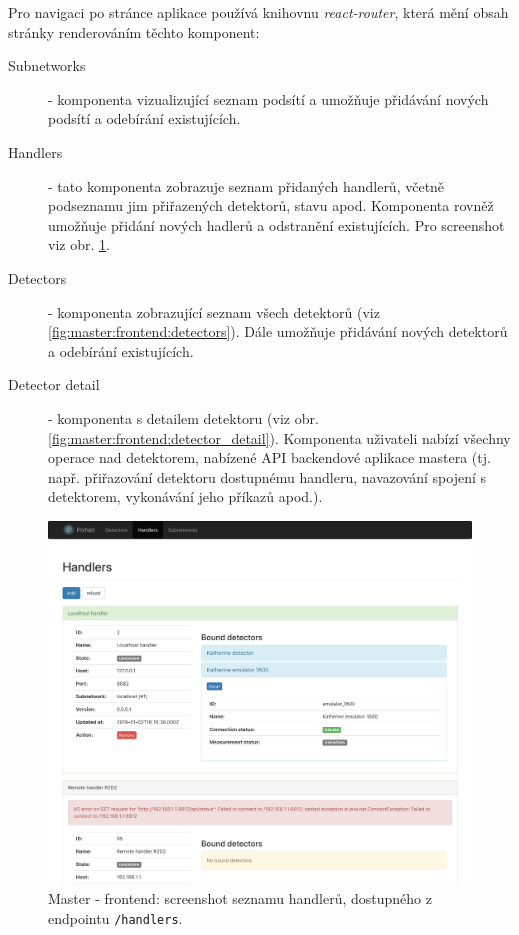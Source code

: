 Pro navigaci po stránce aplikace používá knihovnu \textit{react-router}, která mění obsah stránky renderováním těchto komponent:

\begin{description}
    \item[Subnetworks] - komponenta vizualizující seznam podsítí a umožňuje přidávání nových podsítí a odebírání existujících.
    \item[Handlers] - tato komponenta zobrazuje seznam přidaných handlerů, včetně podseznamu jim přiřazených detektorů, stavu apod. Komponenta rovněž umožňuje přidání nových hadlerů a odstranění existujících. Pro screenshot viz obr. \ref{fig:master:frontend:handlers}.
    \item[Detectors] - komponenta zobrazující seznam všech detektorů (viz \ref{fig:master:frontend:detectors}). Dále umožňuje přidávání nových detektorů a odebírání existujících.
    \item[Detector detail] - komponenta s detailem detektoru (viz obr. \ref{fig:master:frontend:detector_detail}). Komponenta uživateli nabízí všechny operace nad detektorem, nabízené API backendové aplikace mastera (tj. např. přiřazování detektoru dostupnému handleru, navazování spojení s detektorem, vykonávání jeho příkazů apod.).
\end{description}

\begin{figure}[h]
	\begin{center}
        \includegraphics[width=15cm]{figures/master_handlers.png}
	\end{center}
	\caption{Master - frontend: screenshot seznamu handlerů, dostupného z endpointu \texttt{/handlers}.}
	\label{fig:master:frontend:handlers}
\end{figure}

